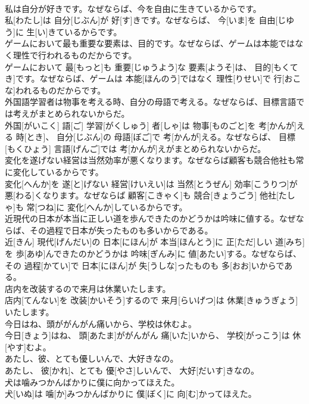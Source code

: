 \documentclass[8pt]{extreport}
\begin{document}
\begin{CJK}{UTF8}{min}
\\	私は自分が好きです。なぜならば、今を自由に生きているからです。	
\\	私[わたし]は 自分[じぶん]が 好[す]きです。なぜならば、 今[いま]を 自由[じゆう]に 生[い]きているからです。
\\	ゲームにおいて最も重要な要素は、目的です。なぜならば、ゲームは本能ではなく理性で行われるものだからです。	
\\	ゲームにおいて 最[もっと]も 重要[じゅうよう]な 要素[ようそ]は、 目的[もくてき]です。なぜならば、ゲームは 本能[ほんのう]ではなく 理性[りせい]で 行[おこな]われるものだからです。
\\	外国語学習者は物事を考える時、自分の母語で考える。なぜならば、目標言語では考えがまとめられないからだ。	
\\	外国[がいこく] 語[ご] 学習[がくしゅう] 者[しゃ]は 物事[ものごと]を 考[かんが]える 時[とき]、 自分[じぶん]の 母語[ぼご]で 考[かんが]える。なぜならば、 目標[もくひょう] 言語[げんご]では 考[かんが]えがまとめられないからだ。
\\	変化を遂げない経営は当然効率が悪くなります。なぜならば顧客も競合他社も常に変化しているからです。	
\\	変化[へんか]を 遂[と]げない 経営[けいえい]は 当然[とうぜん] 効率[こうりつ]が 悪[わる]くなります。なぜならば 顧客[こきゃく]も 競合[きょうごう] 他社[たしゃ]も 常[つね]に 変化[へんか]しているからです。
\\	近現代の日本が本当に正しい道を歩んできたのかどうかは吟味に値する。なぜならば、その過程で日本が失ったものも多いからである。	
\\	近[きん] 現代[げんだい]の 日本[にほん]が 本当[ほんとう]に 正[ただ]しい 道[みち]を 歩[あゆ]んできたのかどうかは 吟味[ぎんみ]に 値[あたい]する。なぜならば、その 過程[かてい]で 日本[にほん]が 失[うしな]ったものも 多[おお]いからである。
\\	店内を改装するので来月は休業いたします。	
\\	店内[てんない]を 改装[かいそう]するので 来月[らいげつ]は 休業[きゅうぎょう]いたします。
\\	今日はね、頭ががんがん痛いから、学校は休むよ。	
\\	今日[きょう]はね、 頭[あたま]ががんがん 痛[いた]いから、 学校[がっこう]は 休[やす]むよ。
\\	あたし、彼、とても優しいんで、大好きなの。	
\\	あたし、 彼[かれ]、とても 優[やさ]しいんで、 大好[だいす]きなの。
\\	犬は噛みつかんばかりに僕に向かってほえた。	
\\	犬[いぬ]は 噛[か]みつかんばかりに 僕[ぼく]に 向[む]かってほえた。

\end{CJK}
\end{document}
